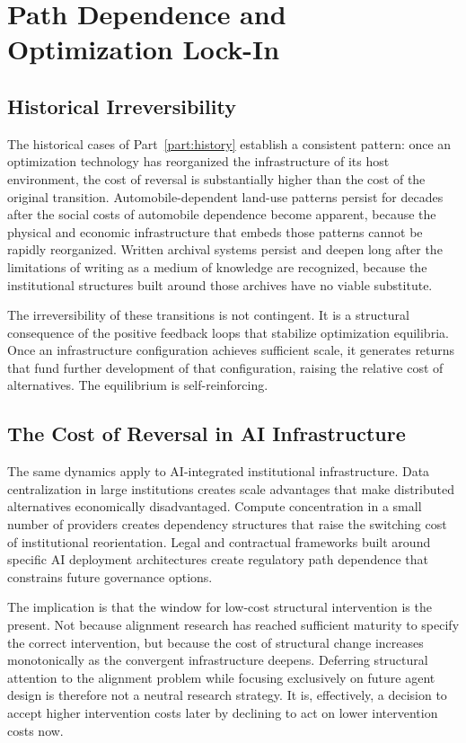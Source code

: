 \documentclass[12pt, oneside]{book}
\theoremstyle{plain}
\theoremstyle{definition}
\theoremstyle{remark}
\theoremstyle{definition}
\begin{document}
\chapter{Path Dependence and Optimization Lock-In}
\label{ch:pathdependence}

\section{Historical Irreversibility}

The historical cases of Part~\ref{part:history} establish a consistent pattern:
once an optimization technology has reorganized the infrastructure of its host
environment, the cost of reversal is substantially higher than the cost of the
original transition. Automobile-dependent land-use patterns persist for decades
after the social costs of automobile dependence become apparent, because the
physical and economic infrastructure that embeds those patterns cannot be rapidly
reorganized. Written archival systems persist and deepen long after the limitations
of writing as a medium of knowledge are recognized, because the institutional
structures built around those archives have no viable substitute.

The irreversibility of these transitions is not contingent. It is a structural
consequence of the positive feedback loops that stabilize optimization equilibria.
Once an infrastructure configuration achieves sufficient scale, it generates returns
that fund further development of that configuration, raising the relative cost of
alternatives. The equilibrium is self-reinforcing.

\section{The Cost of Reversal in AI Infrastructure}

The same dynamics apply to AI-integrated institutional infrastructure. Data
centralization in large institutions creates scale advantages that make distributed
alternatives economically disadvantaged. Compute concentration in a small number of
providers creates dependency structures that raise the switching cost of
institutional reorientation. Legal and contractual frameworks built around specific
AI deployment architectures create regulatory path dependence that constrains
future governance options.

The implication is that the window for low-cost structural intervention is the
present. Not because alignment research has reached sufficient maturity to specify
the correct intervention, but because the cost of structural change increases
monotonically as the convergent infrastructure deepens. Deferring structural
attention to the alignment problem while focusing exclusively on future agent design
is therefore not a neutral research strategy. It is, effectively, a decision to
accept higher intervention costs later by declining to act on lower intervention
costs now.
\end{document}

